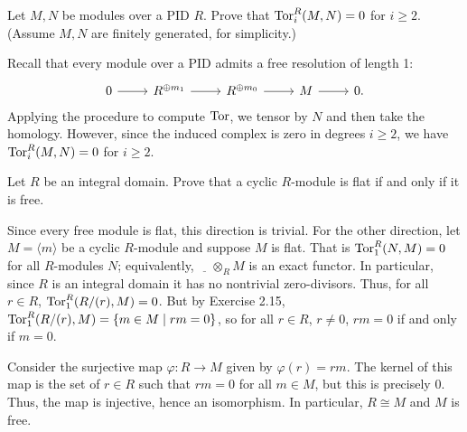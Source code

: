 \documentclass[../../master.tex]{subfiles}
\begin{document}
\begin{problem}
    Let $M, N$ be modules over a PID $R$.
    Prove that $\operatorname{Tor}_i^{R}(M, N) = 0$ for $i \geq 2$.
    (Assume $M, N$ are finitely generated, for simplicity.)
\end{problem}

\begin{solution}
    Recall that every module over a PID admits a free resolution of length 1:
    \[
    \begin{tikzcd}
        0 & R^{\oplus m_1} & R^{\oplus m_0} & M & 0.
        \arrow[from=1-1, to=1-2]
        \arrow[from=1-2, to=1-3]
        \arrow[from=1-3, to=1-4] 
        \arrow[from=1-4, to=1-5] 
    \end{tikzcd}
    \]
    Applying the procedure to compute $\operatorname{Tor}$, we tensor by $N$ and then take the homology.
    However, since the induced complex is zero in degrees $i \geq 2$, we have $\operatorname{Tor}_i^{R}(M, N) = 0$ for $i \geq 2$.
\end{solution}

\begin{problem}
    Let $R$ be an integral domain.
    Prove that a cyclic $R$-module is flat if and only if it is free.
\end{problem}

\begin{solution}
    Since every free module is flat, this direction is trivial.
    For the other direction, let $M = \langle m \rangle$ be a cyclic $R$-module and suppose $M$ is flat.
    That is $\operatorname{Tor}_1^{R}(N, M) = 0$ for all $R$-modules $N$;
    equivalently, $\underline{\hspace{1em}} \otimes_R M$ is an exact functor.
    In particular, since $R$ is an integral domain it has no nontrivial zero-divisors.
    Thus, for all $r \in R$, $\operatorname{Tor}_1^{R}(R/(r), M) = 0$.
    But by Exercise 2.15, $\operatorname{Tor}_1^{R}(R/(r), M) = \{m \in M \mid rm = 0\}$, so for all $r \in R$, $r \neq 0$, $rm = 0$ if and only if $m = 0$.

    Consider the surjective map $\varphi : R \to M$ given by $\varphi(r) = rm$.
    The kernel of this map is the set of $r \in R$ such that $rm = 0$ for all $m \in M$, but this is precisely 0.
    Thus, the map is injective, hence an isomorphism.
    In particular, $R \cong M$ and $M$ is free.
\end{solution}
\end{document}
